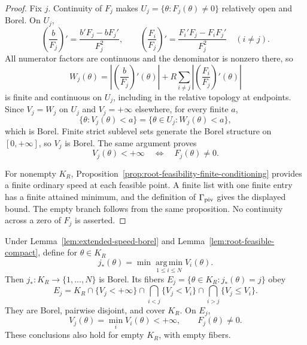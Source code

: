 \begin{proof}
Fix $j$.  Continuity of $F_j$ makes
$U_j=\{\theta:F_j(\theta)\neq0\}$ relatively open and Borel.  On $U_j$,
\[
\left(\frac b{F_j}\right)'=\frac{b'F_j-bF_j'}{F_j^2},
\qquad
\left(\frac{F_i}{F_j}\right)'=
\frac{F_i'F_j-F_iF_j'}{F_j^2}\quad(i\neq j).
\]
All numerator factors are continuous and the denominator is nonzero there,
so
\[
W_j(\theta)=
\left|\left(\frac b{F_j}\right)'(\theta)\right|
 +R\sum_{i\neq j}\left|\left(\frac{F_i}{F_j}\right)'(\theta)\right|
\]
is finite and continuous on $U_j$, including in the relative topology at
endpoints.  Since $V_j=W_j$ on $U_j$ and $V_j=+\infty$ elsewhere, for every
finite $a$,
\[
\{\theta:V_j(\theta)<a\}=\{\theta\in U_j:W_j(\theta)<a\},
\]
which is Borel.  Finite strict sublevel sets generate the Borel structure on
$[0,+\infty]$, so $V_j$ is Borel.  The same argument proves
\[
V_j(\theta)<+\infty\quad\Longleftrightarrow\quad F_j(\theta)\neq0.
\]

For nonempty $K_R$, Proposition~\ref{prop:root-feasibility-finite-conditioning}
provides a finite ordinary speed at each feasible point.  A finite list with
one finite entry has a finite attained minimum, and the definition of
$\Gamma_{\rm piv}$ gives the displayed bound.  The empty branch follows
from the same proposition.  No continuity across a zero of $F_j$ is
asserted.
\end{proof}

\begin{proposition}
\label{prop:lexicographic-pivot-partition}
Under Lemma~\ref{lem:extended-speed-borel} and
Lemma~\ref{lem:root-feasible-compact}, define for $\theta\in K_R$
\[
j_*(\theta)=\min\operatorname*{arg\,min}_{1\leq i\leq N}V_i(\theta).
\]
Then $j_*:K_R\to\{1,\ldots,N\}$ is Borel.  Its fibers
$E_j=\{\theta\in K_R:j_*(\theta)=j\}$ obey
\[
E_j=K_R\cap\{V_j<+\infty\}
\cap\bigcap_{i<j}\{V_j<V_i\}
\cap\bigcap_{i>j}\{V_j\leq V_i\}.
\tag{A1}\label{eq:a1}
\]
They are Borel, pairwise disjoint, and cover $K_R$.  On $E_j$,
\[
V_j(\theta)=\min_iV_i(\theta)<+\infty,
\qquad F_j(\theta)\neq0.
\]
These conclusions also hold for empty $K_R$, with empty fibers.
\end{proposition}

